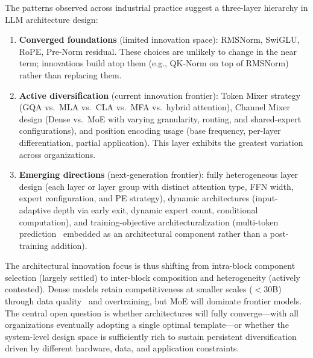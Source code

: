 The patterns observed across industrial practice suggest a three-layer hierarchy in LLM architecture design:

\begin{enumerate}[leftmargin=*]
  \item \textbf{Converged foundations} (limited innovation space): RMSNorm, SwiGLU, RoPE, Pre-Norm residual. These choices are unlikely to change in the near term; innovations build atop them (e.g., QK-Norm on top of RMSNorm) rather than replacing them.

  \item \textbf{Active diversification} (current innovation frontier): Token Mixer strategy (GQA vs.\ MLA vs.\ CLA vs.\ MFA vs.\ hybrid attention), Channel Mixer design (Dense vs.\ MoE with varying granularity, routing, and shared-expert configurations), and position encoding usage (base frequency, per-layer differentiation, partial application). This layer exhibits the greatest variation across organizations.

  \item \textbf{Emerging directions} (next-generation frontier): fully heterogeneous layer design (each layer or layer group with distinct attention type, FFN width, expert configuration, and PE strategy), dynamic architectures (input-adaptive depth via early exit, dynamic expert count, conditional computation), and training-objective architecturalization (multi-token prediction~\cite{liu2024deepseek} embedded as an architectural component rather than a post-training addition).
\end{enumerate}

The architectural innovation focus is thus shifting from intra-block component selection (largely settled) to inter-block composition and heterogeneity (actively contested). Dense models retain competitiveness at smaller scales ($<$30B) through data quality~\cite{abdin2024phi4} and overtraining, but MoE will dominate frontier models. The central open question is whether architectures will fully converge---with all organizations eventually adopting a single optimal template---or whether the system-level design space is sufficiently rich to sustain persistent diversification driven by different hardware, data, and application constraints.
